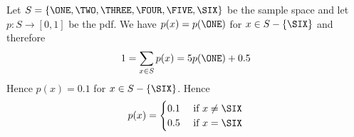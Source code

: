 
Let $S = \{\ONE, \TWO, \THREE, \FOUR, \FIVE, \SIX\}$ be the sample space
and let $p : S \rightarrow [0, 1]$ be the pdf.
We have $p(x) = p(\ONE)$ for $x \in S - \{\SIX\}$ and therefore 
\[
1 = \sum_{x \in S} p(x) = 5 p(\ONE) + 0.5
\]
Hence $p(x) = 0.1$ for $x \in S - \{ \SIX \}$.
Hence
\[
p(x) =
\begin{cases}
0.1 &  \text{ if } x \neq \SIX \\
0.5 &  \text{ if } x = \SIX 
\end{cases}
\]
